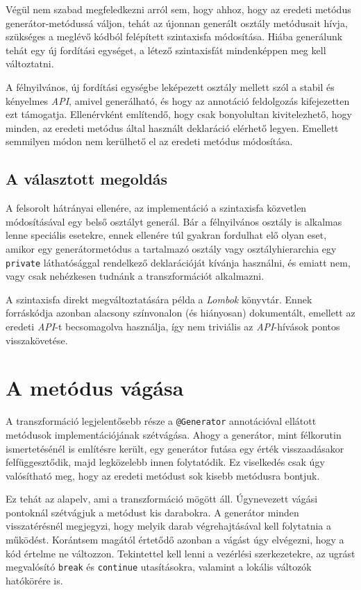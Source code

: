 Végül nem szabad megfeledkezni arról sem, hogy ahhoz, hogy az eredeti metódus generátor-metódussá váljon, tehát az újonnan generált osztály metódusait hívja, szükséges a meglévő kódból felépített szintaxisfa módosítása. Hiába generálunk tehát egy új fordítási egységet, a létező szintaxisfát mindenképpen meg kell változtatni.

A félnyilvános, új fordítási egységbe leképezett osztály mellett szól a stabil és kényelmes \textit{API}, amivel generálható, és hogy az annotáció feldolgozás kifejezetten ezt támogatja. Ellenérvként említendő, hogy csak bonyolultan kivitelezhető, hogy minden, az eredeti metódus által használt deklaráció elérhető legyen. Emellett semmilyen módon nem kerülhető el az eredeti metódus módosítása.

\subsection{A választott megoldás}

A felsorolt hátrányai ellenére, az implementáció a szintaxisfa közvetlen módosításával egy belső osztályt generál. Bár a félnyilvános osztály is alkalmas lenne speciális esetekre, ennek ellenére túl gyakran fordulhat elő olyan eset, amikor egy generátormetódus a tartalmazó osztály vagy osztályhierarchia egy \texttt{private} láthatósággal rendelkező deklarációját kívánja használni, és emiatt nem, vagy csak nehézkesen tudnánk a transzformációt alkalmazni.

A szintaxisfa direkt megváltoztatására példa a \textit{Lombok} könyvtár. Ennek forráskódja azonban alacsony színvonalon (és hiányosan) dokumentált, emellett az eredeti \textit{API}-t becsomagolva használja, így nem triviális az \textit{API}-hívások pontos visszakövetése.

\section{A metódus vágása}

A transzformáció legjelentősebb része a \texttt{@Generator} annotációval ellátott metódusok implementációjának szétvágása. Ahogy a generátor, mint félkorutin ismertetésénél is említésre került, egy generátor futása egy érték visszaadásakor felfüggesztődik, majd legközelebb innen folytatódik. Ez viselkedés csak úgy valósítható meg, hogy az eredeti metódust sok kisebb metódusra bontjuk.

Ez tehát az alapelv, ami a transzformáció mögött áll. Úgynevezett vágási pontoknál szétvágjuk a metódust kis darabokra. A generátor minden visszatérésnél megjegyzi, hogy melyik darab végrehajtásával kell folytatnia a működést. Korántsem magától értetődő azonban a vágást úgy elvégezni, hogy a kód értelme ne változzon. Tekintettel kell lenni a vezérlési szerkezetekre, az ugrást megvalósító \texttt{break} és \texttt{continue} utasításokra, valamint a lokális változók hatókörére is.


